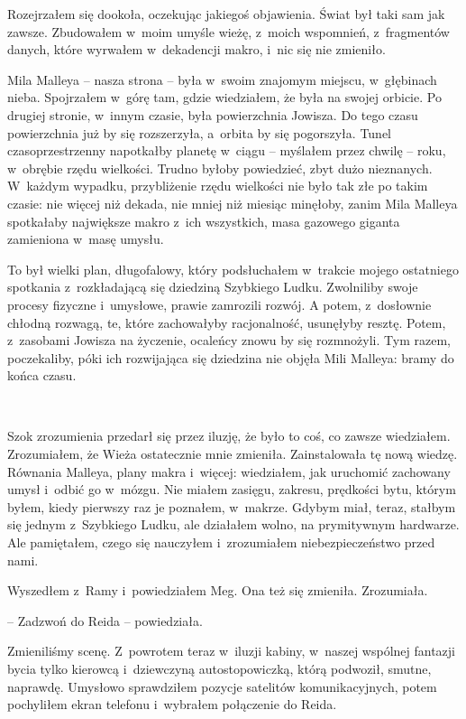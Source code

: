 \documentclass[oneside,polish,11pt,sfheadings]{mwbk}
\begin{document}
Rozejrzałem się dookoła, oczekując jakiegoś objawienia. Świat był taki
sam jak zawsze. Zbudowałem w~moim umyśle wieżę, z~moich wspomnień, z~fragmentów danych, które wyrwałem w~dekadencji makro, i~nic się nie
zmieniło.

Mila Malleya -- nasza strona -- była w~swoim znajomym miejscu, w~głębinach
nieba. Spojrzałem w~górę tam, gdzie wiedziałem, że była na swojej
orbicie. Po drugiej stronie, w~innym czasie, była powierzchnia Jowisza.
Do tego czasu powierzchnia już by się rozszerzyła, a~orbita by się
pogorszyła. Tunel czasoprzestrzenny napotkałby planetę w~ciągu -- myślałem przez chwilę -- roku, w~obrębie rzędu wielkości. Trudno byłoby
powiedzieć, zbyt dużo nieznanych. W~każdym wypadku, przybliżenie rzędu
wielkości nie było tak złe po takim czasie: nie więcej niż dekada, nie
mniej niż miesiąc minęłoby, zanim Mila Malleya spotkałaby największe
makro z~ich wszystkich, masa gazowego giganta zamieniona w~masę umysłu.

To był wielki plan, długofalowy, który podsłuchałem w~trakcie mojego
ostatniego spotkania z~rozkładającą się dziedziną Szybkiego Ludku.
Zwolniliby swoje procesy fizyczne i~umysłowe, prawie zamrozili rozwój. A
potem, z~dosłownie chłodną rozwagą, te, które zachowałyby racjonalność,
usunęłyby resztę. Potem, z~zasobami Jowisza na życzenie, ocaleńcy znowu
by się rozmnożyli. Tym razem, poczekaliby, póki ich rozwijająca się
dziedzina nie objęła Mili Malleya: bramy do końca czasu.

~

Szok zrozumienia przedarł się przez iluzję, że było to coś, co zawsze
wiedziałem. Zrozumiałem, że Wieża ostatecznie mnie zmieniła.
Zainstalowała tę nową wiedzę. Równania Malleya, plany makra i~więcej:
wiedziałem, jak uruchomić zachowany umysł i~odbić go w~mózgu. Nie miałem
zasięgu, zakresu, prędkości bytu, którym byłem, kiedy pierwszy raz je
poznałem, w~makrze. Gdybym miał, teraz, stałbym się jednym z~Szybkiego
Ludku, ale działałem wolno, na prymitywnym hardwarze. Ale pamiętałem,
czego się nauczyłem i~zrozumiałem niebezpieczeństwo przed nami.

Wyszedłem z~Ramy i~powiedziałem Meg. Ona też się zmieniła. Zrozumiała.

-- Zadzwoń do Reida -- powiedziała.

Zmieniliśmy scenę. Z~powrotem teraz w~iluzji kabiny, w~naszej wspólnej
fantazji bycia tylko kierowcą i~dziewczyną autostopowiczką, którą
podwoził, smutne, naprawdę. Umysłowo sprawdziłem pozycje satelitów
komunikacyjnych, potem pochyliłem ekran telefonu i~wybrałem połączenie
do Reida.
\end{document}
